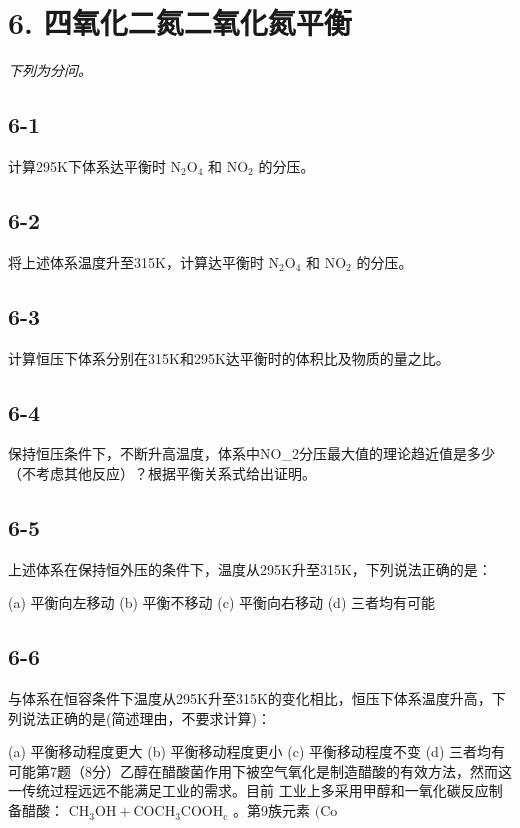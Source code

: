 \section*{6. 四氧化二氮二氧化氮平衡}
\textit{下列为分问。}

\subsection*{6-1}
计算295K下体系达平衡时 $\mathrm { N _ { 2 } O _ { 4 } }$ 和 $\mathrm { N O _ { 2 } }$ 的分压。

\subsection*{6-2}
将上述体系温度升⾄315K，计算达平衡时 $\mathrm { N _ { 2 } O _ { 4 } }$ 和 $\mathrm { N O _ { 2 } }$ 的分压。

\subsection*{6-3}
计算恒压下体系分别在315K和295K达平衡时的体积⽐及物质的量之⽐。

\subsection*{6-4}
保持恒压条件下，不断升⾼温度，体系中NO_{2}分压最⼤值的理论趋近值是多少（不考虑其他反应）？根据平衡关系式给出证明。

\subsection*{6-5}
上述体系在保持恒外压的条件下，温度从295K升⾄315K，下列说法正确的是：

(a) 平衡向左移动 (b) 平衡不移动 (c) 平衡向右移动 (d) 三者均有可能

\subsection*{6-6}
与体系在恒容条件下温度从295K升⾄315K的变化相⽐，恒压下体系温度升⾼，下列说法正确的是(简述理由，不要求计算)：

(a) 平衡移动程度更⼤ (b) 平衡移动程度更⼩ (c) 平衡移动程度不变 (d) 三者均有可能第7题（8分）⼄醇在醋酸菌作⽤下被空⽓氧化是制造醋酸的有效⽅法，然⽽这⼀传统过程远远不能满⾜⼯业的需求。⽬前 ⼯业上多采⽤甲醇和⼀氧化碳反应制备醋酸： $\mathrm { C H _ { 3 } O H + C O  C H _ { 3 } C O O H _ { c } }$ 。第9族元素 $( \mathrm { C o }$

